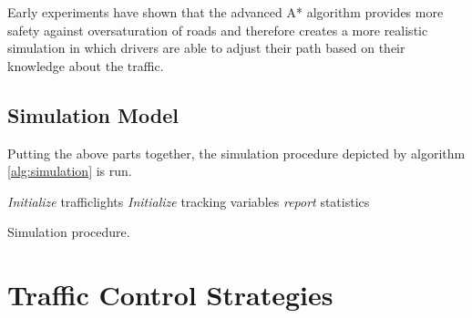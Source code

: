 \documentclass[11pt]{article}
\begin{document}
Early experiments have shown that the advanced A* algorithm provides more safety against oversaturation of roads and therefore creates a more realistic simulation in which drivers are able to adjust their path based on their knowledge about the traffic.

\subsection{Simulation Model}
Putting the above parts together, the simulation procedure depicted by algorithm \ref{alg:simulation} is run.

\DontPrintSemicolon
{}
\begin{algorithm}[h]
	\;
	\;
	\textit{Initialize} trafficlights\;
	\textit{Initialize} tracking variables\;
	\; 
	\;
	\textit{report} statistics\;	
	
	\caption{Simulation procedure. \label{alg:simulation}}

\end{algorithm}

\section{Traffic Control Strategies}
\end{document}
